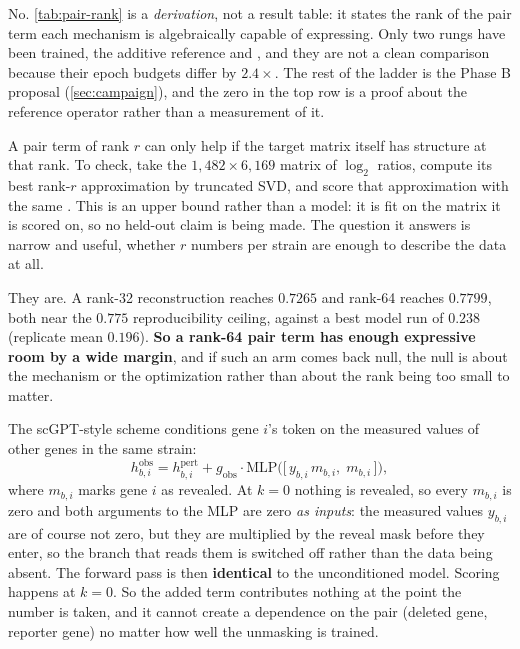  No. \cref{tab:pair-rank} is a \emph{derivation}, not a
result table: it states the rank of the pair term each mechanism is algebraically capable of
expressing. Only two rungs have been trained, the additive reference and
, and they are not a clean comparison because their epoch budgets differ by
$2.4\times$. The rest of the ladder is the Phase B proposal (\cref{sec:campaign}), and the
zero in the top row is a proof about the reference operator rather than a measurement of it.

 A pair term of rank
$r$ can only help if the target matrix itself has structure at that rank. To check, take the
$1{,}482 \times 6{,}169$ matrix of $\log_2$ ratios, compute its best rank-$r$ approximation
by truncated SVD, and score that approximation with the same
. This is an upper bound rather than a model: it is fit on the
matrix it is scored on, so no held-out claim is being made. The question it answers is
narrow and useful, whether $r$ numbers per strain are enough to describe the data at all.

They are. A rank-32 reconstruction reaches $0.7265$ and rank-64 reaches $0.7799$, both near
the $0.775$ reproducibility ceiling, against a best model run of $0.238$ (replicate mean
$0.196$). \textbf{So a
rank-64 pair term has enough expressive room by a wide margin}, and if such an arm comes back
null, the null is about the mechanism or the optimization rather than about the rank being
too small to matter.

 The scGPT-style scheme conditions gene $i$'s token on the measured values of
other genes in the same strain:
$$h^{\text{obs}}_{b,i} = h^{\text{pert}}_{b,i}
  + g_{\text{obs}}\cdot\mathrm{MLP}\big(\big[\,y_{b,i}\,m_{b,i},\; m_{b,i}\,\big]\big),$$
where $m_{b,i}$ marks gene $i$ as revealed. At $k = 0$ nothing is revealed, so every
$m_{b,i}$ is zero and both arguments to the MLP are zero \emph{as inputs}: the measured
values $y_{b,i}$ are of course not zero, but they are multiplied by the reveal mask before
they enter, so the branch that reads them is switched off rather than the data being absent.
The forward pass is then \textbf{identical} to the unconditioned model. Scoring happens at
$k = 0$. So the added term contributes nothing at the point the number is taken, and it
cannot create a dependence on the pair (deleted gene, reporter gene) no matter how well the
unmasking is trained.

